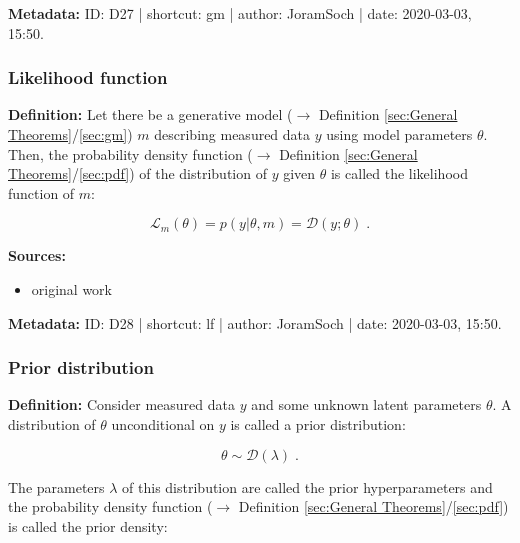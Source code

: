 \documentclass[a4paper,12pt]{book}
\begin{document}
\vspace{1em}
\textbf{Metadata:} ID: D27 | shortcut: gm | author: JoramSoch | date: 2020-03-03, 15:50.


\subsubsection[\textit{Likelihood function}]{Likelihood function} \label{sec:lf}

\vspace{1em}
\textbf{Definition:} Let there be a generative model ($\rightarrow$ Definition \ref{sec:General Theorems}/\ref{sec:gm}) $m$ describing measured data $y$ using model parameters $\theta$. Then, the probability density function ($\rightarrow$ Definition \ref{sec:General Theorems}/\ref{sec:pdf}) of the distribution of $y$ given $\theta$ is called the likelihood function of $m$:

\begin{equation} \label{eq:lf-gm}
\mathcal{L}_m(\theta) = p(y|\theta,m) = \mathcal{D}(y; \theta) \; .
\end{equation}

\vspace{1em}
\textbf{Sources:}
\begin{itemize}
\item original work\end{itemize}


\vspace{1em}
\textbf{Metadata:} ID: D28 | shortcut: lf | author: JoramSoch | date: 2020-03-03, 15:50.


\subsubsection[\textit{Prior distribution}]{Prior distribution} \label{sec:prior}

\vspace{1em}
\textbf{Definition:} Consider measured data $y$ and some unknown latent parameters $\theta$. A distribution of $\theta$ unconditional on $y$ is called a prior distribution:

\begin{equation} \label{eq:prior-prior}
\theta \sim \mathcal{D}(\lambda) \; .
\end{equation}

The parameters $\lambda$ of this distribution are called the prior hyperparameters and the probability density function ($\rightarrow$ Definition \ref{sec:General Theorems}/\ref{sec:pdf}) is called the prior density:
\end{document}
